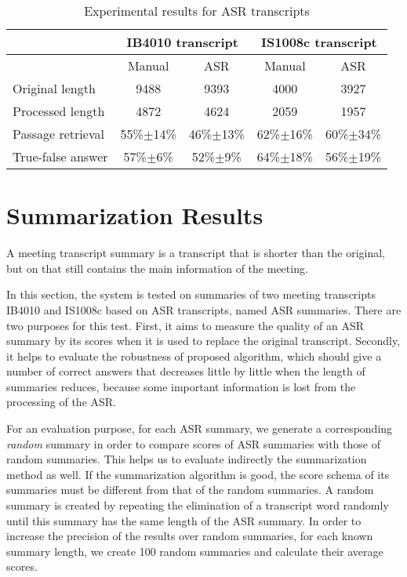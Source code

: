 \begin{table}[htbp]
\caption{Experimental results for ASR transcripts}
\begin{tabular}{|l|c|c|c|c|}
\hline
\multicolumn{1}{|c|}{} & \multicolumn{ 2}{c|}{IB4010 transcript} & \multicolumn{ 2}{c|}{IS1008c transcript} \\ \hline
\multicolumn{1}{|c|}{} & Manual & ASR & Manual & ASR \\ \hline
Original length & 9488 & 9393 & 4000 & 3927 \\ \hline
Processed length & 4872 & 4624 & 2059 & 1957 \\ \hline
Passage retrieval & 55\%\ensuremath{\pm}14\% & 46\%\ensuremath{\pm}13\% & 62\%\ensuremath{\pm}16\% & 60\%\ensuremath{\pm}34\% \\ \hline
True-false answer & 57\%\ensuremath{\pm}6\% & 52\%\ensuremath{\pm}9\% & 64\%\ensuremath{\pm}18\% & 56\%\ensuremath{\pm}19\% \\ \hline
\end{tabular}
\label{results for ASR transcripts}
\end{table}



\section{Summarization Results}

A meeting transcript summary is a transcript that is shorter than the original, but on that still contains the main information of the meeting.

In this section, the system is tested on summaries of two meeting transcripts IB4010 and IS1008c based on ASR transcripts, named ASR summaries. There are two purposes for this test. First, it aims to measure the quality of an ASR summary by its scores when it is used to replace the original transcript. Secondly, it helps to evaluate the robustness of proposed algorithm, which should give a number of correct answers that decreases little by little when the length of summaries reduces, because some important information is lost from the processing of the ASR.

For an evaluation purpose, for each ASR summary, we generate a corresponding \textit{random} summary in order to compare scores of ASR summaries with those of random summaries. This helps us to evaluate indirectly the summarization method as well. If the summarization algorithm is good, the score schema of its summaries must be different from that of the random summaries. A random summary is created by repeating the elimination of a transcript word randomly until this summary has the same length of the ASR summary. In order to increase the precision of the results over random summaries, for each known summary length, we create 100 random summaries and calculate their average scores.

